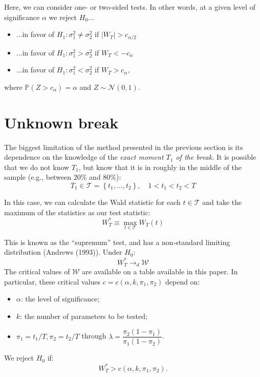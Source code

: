 \documentclass[11pt, a4paper]{report}
\theoremstyle{plain}
\theoremstyle{plain}
\theoremstyle{remark}
\begin{document}
Here, we can consider one- or two-sided tests. In other words, at a given level of significance $\alpha$ we reject $H_{0}...$ \begin{itemize}
\item ...in favor of $H_{1}: \sigma_{1}^{2} \neq \sigma_{2}^{2}$ if $\left|W_{T}\right|>c_{\alpha / 2}$

\item ...in favor of $H_{1}: \sigma_{1}^{2}>\sigma_{2}^{2}$ if $W_{T}<-c_{\alpha}$

\item ...in favor of $H_{1}: \sigma_{1}^{2}<\sigma_{2}^{2}$ if $W_{T}>c_{\alpha},$
\end{itemize}
where $\mathbb{P}\left(Z>c_{\alpha}\right)=\alpha$ and $Z \sim \mathcal{N}(0,1).$

\section{Unknown break}
\label{supremum-test}

The biggest limitation of the method presented in the previous section is its dependence on the knowledge of the \textit{exact moment $T_1$ of the break.} It is possible that we do not know $T_1$, but know that it is in roughly in the middle of the sample (e.g., between 20\% and 80\%):
 $$
T_{1} \in \mathcal{T}=\left\{t_{1}, \ldots, t_{2}\right\}, \quad 1<t_{1}<t_{2}<T
$$

In this case, we can calculate the Wald statistic for each $t \in \mathcal{T}$ and take the maximum of the statistics as our test statistic:
$$
W_{T}^{*} \equiv \max _{t \in \mathcal{T}} W_{T}(t)
$$

This is known as the ``supremum'' test, and has a non-standard limiting distribution (Andrews (1993)). Under $H_0:$
$$W_T^* \to_d \mathcal{W}$$
The critical values of $\mathcal{W}$ are available on a table available in this paper. In particular, these critical values $c = c(\alpha, k, \pi_1, \pi_2)$ depend on:
\begin{itemize}
\item $\alpha$: the level of significance;
\item $k$: the number of parameters to be tested;
\item $\pi_1 = t_1/T, \pi_2 = t_2/T$ through $\lambda = \dfrac{\pi_2(1-\pi_1)}{\pi_1(1-\pi_2)}$.
\end{itemize}

We reject $H_0$ if:
$$W_{T}^{*}>c\left(\alpha, k, \pi_{1}, \pi_{2}\right).$$
\end{document}
